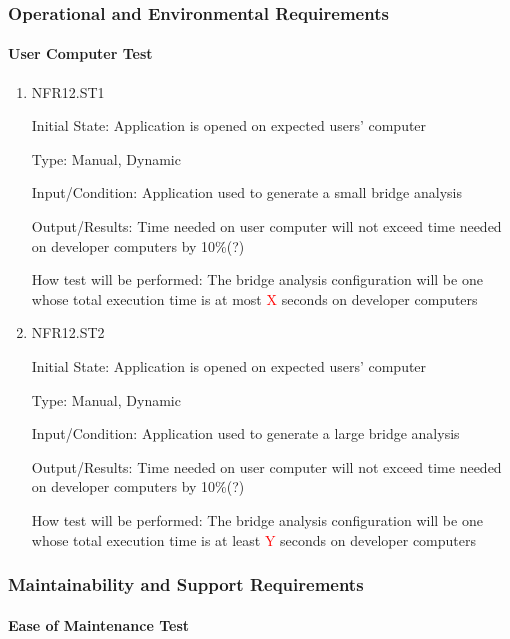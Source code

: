 \documentclass[12pt, titlepage]{article}
\begin{document}
\subsubsection{Operational and Environmental Requirements}
		
\paragraph{User Computer Test}

\begin{enumerate}

\item{NFR12.ST1\\}

Initial State: Application is opened on expected users' computer

Type: Manual, Dynamic

Input/Condition: Application used to generate a small bridge analysis

Output/Results: Time needed on user computer will not exceed time needed on developer computers by 10\%(?)

How test will be performed: The bridge analysis configuration will be one whose total execution time is at most \textcolor{red}{X} seconds on developer computers

\item{NFR12.ST2\\}

Initial State: Application is opened on expected users' computer

Type: Manual, Dynamic

Input/Condition: Application used to generate a large bridge analysis

Output/Results: Time needed on user computer will not exceed time needed on developer computers by 10\%(?)

How test will be performed: The bridge analysis configuration will be one whose total execution time is at least \textcolor{red}{Y} seconds on developer computers

\end{enumerate}

\subsubsection{Maintainability and Support Requirements}
		
\paragraph{Ease of Maintenance Test}
\end{document}

